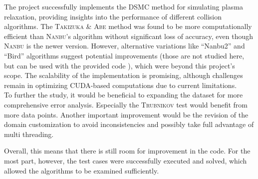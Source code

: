 The project successfully implements the DSMC method for simulating plasma relaxation, providing  insights into the performance of different collision algorithms. The \textsc{Takizuka} \& \textsc{Abe} method was found to be more computationally efficient than \textsc{Nanbu}'s algorithm without significant loss of accuracy, even though \textsc{Nanbu} is the newer version. However, alternative variations like ``Nanbu2'' and ``Bird'' algorithms suggest potential improvements (those are not studied here, but can be used with the provided code \cite{aliemen2024}), which were beyond this project's scope. The scalability of the implementation is promising, although challenges remain in optimizing CUDA-based computations due to current limitations. \\
To further the study, it would be beneficial to expanding the dataset for more comprehensive error analysis. Especially the \textsc{Trubnikov} test would benefit from more data points. Another important improvement would be the revision of the domain customization to avoid inconsistencies and possibly take full advantage of multi threading.

Overall, this means that there is still room for improvement in the code. For the most part, however, the test cases were successfully executed and solved, which allowed the algorithms to be examined sufficiently.



